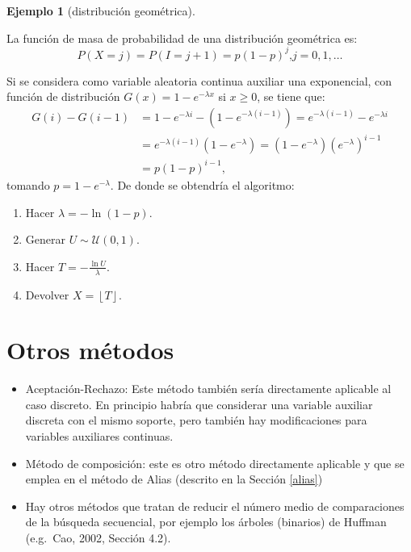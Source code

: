 \documentclass[
]{book}
\theoremstyle{break}
\theoremstyle{definition}
\theoremstyle{definition}
\newtheorem{example}{Ejemplo}[chapter]
\theoremstyle{definition}
\theoremstyle{definition}
\theoremstyle{remark}
\begin{document}
\begin{example}[distribución geométrica]
\protect\hypertarget{exm:unnamed-chunk-24}{}{\label{exm:unnamed-chunk-24} {} }
\end{example}

La función de masa de probabilidad de una distribución geométrica es:
\[P\left( X=j\right)  =P\left( I=j+1\right)  =p\left( 1-p\right)^{j}\text{,
}j=0,1,\ldots\]

Si se considera como variable aleatoria continua auxiliar una
exponencial, con función de distribución
\(G\left( x\right) = 1-e^{-\lambda x}\) si \(x\geq0\),
se tiene que:
\[\begin{aligned}
G\left( i\right) - G\left( i-1\right)   
& = 1-e^{-\lambda i}-\left(1-e^{-\lambda\left( i-1\right) }\right)  
= e^{-\lambda\left( i-1\right)}-e^{-\lambda i}\\
& = e^{-\lambda\left( i-1\right)  }\left( 1-e^{-\lambda}\right)  
= \left( 1-e^{-\lambda}\right)  \left( e^{-\lambda}\right)^{i-1} \\
& = p\left(1-p\right)^{i-1},
\end{aligned}\]
tomando \(p=1-e^{-\lambda}\).
De donde se obtendría el algoritmo:

\begin{enumerate}
\def\labelenumi{\arabic{enumi}.}
\setcounter{enumi}{-1}
\item
  Hacer \(\lambda=-\ln\left( 1-p\right)\).
\item
  Generar \(U\sim \mathcal{U}\left( 0,1\right)\).
\item
  Hacer \(T=-\frac{\ln U}{\lambda}\).
\item
  Devolver \(X=\left\lfloor T\right\rfloor\).
\end{enumerate}

\hypertarget{otros-muxe9todos}{%
\section{Otros métodos}\label{otros-muxe9todos}}

\begin{itemize}
\item
  Aceptación-Rechazo: Este método también sería directamente aplicable al
  caso discreto. En principio habría que considerar una variable
  auxiliar discreta con el mismo soporte, pero también hay modificaciones
  para variables auxiliares continuas.
\item
  Método de composición: este es otro método directamente aplicable y
  que se emplea en el método de Alias (descrito en la Sección \ref{alias})
\item
  Hay otros métodos que tratan de reducir el número medio de comparaciones
  de la búsqueda secuencial, por ejemplo los árboles (binarios) de Huffman
  (e.g.~Cao, 2002, Sección 4.2).
\end{itemize}
\end{document}
